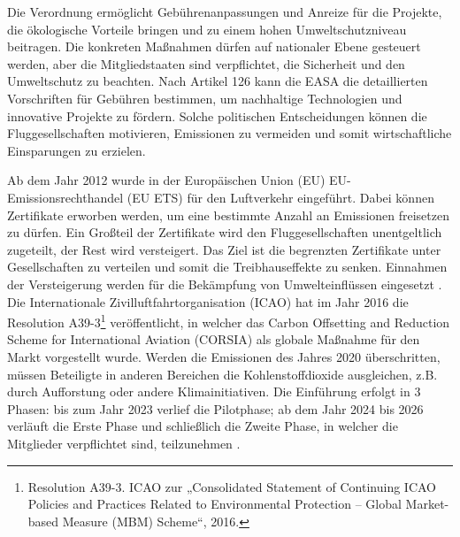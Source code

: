 Die Verordnung ermöglicht Gebührenanpassungen und Anreize für die Projekte, 
die ökologische Vorteile bringen und zu einem hohen Umweltschutzniveau beitragen.
%
Die konkreten Maßnahmen dürfen auf nationaler Ebene gesteuert werden, 
aber die Mitgliedstaaten sind verpflichtet, die Sicherheit und den Umweltschutz zu beachten. 
Nach Artikel 126 kann die EASA die detaillierten 
Vorschriften für Gebühren bestimmen, um nachhaltige Technologien und innovative Projekte zu fördern.
%
%
Solche politischen Entscheidungen können die Fluggesellschaften motivieren, 
Emissionen zu vermeiden und somit wirtschaftliche Einsparungen zu erzielen.

Ab dem Jahr 2012 wurde in der Europäischen Union (EU) EU-Emissionsrechthandel (EU ETS) für den Luftverkehr eingeführt.
Dabei können Zertifikate erworben werden, um eine bestimmte Anzahl an Emissionen freisetzen zu dürfen.
Ein Großteil der Zertifikate wird den Fluggesellschaften unentgeltlich zugeteilt, der Rest wird versteigert. 
Das Ziel ist die begrenzten Zertifikate unter Gesellschaften zu verteilen und somit die Treibhauseffekte zu senken.
Einnahmen der Versteigerung werden für die Bekämpfung von Umwelteinflüssen eingesetzt \cite{conrady2019luftverkehr}.
Die Internationale Zivilluftfahrtorganisation (ICAO) hat im Jahr 2016 die Resolution A39-3\footnote{Resolution A39-3. ICAO zur „Consolidated Statement of Continuing ICAO Policies and Practices Related to Environmental Protection – Global Market-based Measure (MBM) Scheme“, 2016.} veröffentlicht, 
in welcher das Carbon Offsetting and Reduction Scheme for International Aviation (CORSIA) 
als globale Maßnahme für den Markt vorgestellt wurde. 
Werden die Emissionen des Jahres 2020 überschritten, müssen Beteiligte in anderen Bereichen 
die Kohlenstoffdioxide ausgleichen, z.B. durch Aufforstung oder andere Klimainitiativen. 
Die Einführung erfolgt in 3 Phasen: 
bis zum Jahr 2023 verlief die Pilotphase; ab dem Jahr 2024 bis 2026 verläuft die Erste Phase und schließlich die Zweite Phase, 
in welcher die Mitglieder verpflichtet sind, teilzunehmen \cite{conrady2019luftverkehr}. 


